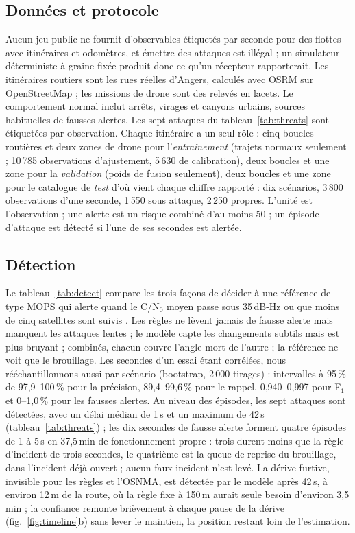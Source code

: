 \documentclass[conference]{IEEEtran}
\begin{document}
\subsection{Données et protocole}
Aucun jeu public ne fournit d'observables étiquetés par seconde pour des flottes avec itinéraires et odomètres, et émettre des attaques est illégal ; un simulateur déterministe à graine fixée produit donc ce qu'un récepteur rapporterait. Les itinéraires routiers sont les rues réelles d'Angers, calculés avec OSRM sur OpenStreetMap ; les missions de drone sont des relevés en lacets. Le comportement normal inclut arrêts, virages et canyons urbains, sources habituelles de fausses alertes. Les sept attaques du tableau~\ref{tab:threats} sont étiquetées par observation. Chaque itinéraire a un seul rôle : cinq boucles routières et deux zones de drone pour l'\emph{entraînement} (trajets normaux seulement ; 10\,785 observations d'ajustement, 5\,630 de calibration), deux boucles et une zone pour la \emph{validation} (poids de fusion seulement), deux boucles et une zone pour le catalogue de \emph{test} d'où vient chaque chiffre rapporté : dix scénarios, 3\,800 observations d'une seconde, 1\,550 sous attaque, 2\,250 propres. L'unité est l'observation ; une alerte est un risque combiné d'au moins 50 ; un épisode d'attaque est détecté si l'une de ses secondes est alertée.

\subsection{Détection}
Le tableau~\ref{tab:detect} compare les trois façons de décider à une référence de type MOPS qui alerte quand le C/N$_0$ moyen passe sous 35\,dB-Hz ou que moins de cinq satellites sont suivis \cite{kriezis2025}. Les règles ne lèvent jamais de fausse alerte mais manquent les attaques lentes ; le modèle capte les changements subtils mais est plus bruyant ; combinés, chacun couvre l'angle mort de l'autre ; la référence ne voit que le brouillage. Les secondes d'un essai étant corrélées, nous rééchantillonnons aussi par scénario (bootstrap, 2\,000 tirages) : intervalles à 95\,\% de 97,9--100\,\% pour la précision, 89,4--99,6\,\% pour le rappel, 0,940--0,997 pour F$_1$ et 0--1,0\,\% pour les fausses alertes. Au niveau des épisodes, les sept attaques sont détectées, avec un délai médian de 1\,s et un maximum de 42\,s (tableau~\ref{tab:threats}) ; les dix secondes de fausse alerte forment quatre épisodes de 1 à 5\,s en 37,5\,min de fonctionnement propre : trois durent moins que la règle d'incident de trois secondes, le quatrième est la queue de reprise du brouillage, dans l'incident déjà ouvert ; aucun faux incident n'est levé. La dérive furtive, invisible pour les règles et l'OSNMA, est détectée par le modèle après 42\,s, à environ 12\,m de la route, où la règle fixe à 150\,m aurait seule besoin d'environ 3,5\,min ; la confiance remonte brièvement à chaque pause de la dérive (fig.~\ref{fig:timeline}b) sans lever le maintien, la position restant loin de l'estimation.
\end{document}
